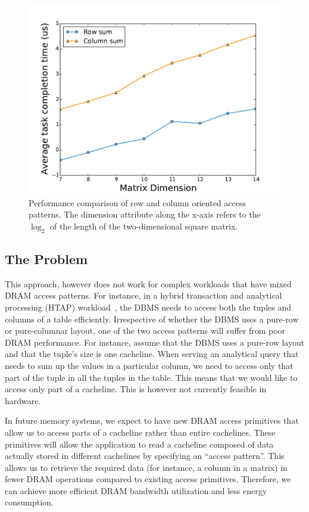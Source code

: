 \documentclass[letterpaper]{article}
\begin{document}
\begin{figure}[ht]
	\centering
	\includegraphics[scale=0.35]{images/rowmajor}
	\caption{Performance comparison of row and column oriented access patterns.
	The dimension attribute along the x-axis refers to the $\log_2$ of the length of the two-dimensional square matrix. }
	\label{fig:perf}
\end{figure}


\subsection{The Problem}

This approach, however does not work for complex workloads that have
mixed DRAM access patterns. For instance, in a hybrid transaction and
analytical processing (HTAP) workload~\cite{grund10}, the DBMS needs to 
access both the tuples and columns of a table efficiently. Irrespective of
whether the DBMS uses a pure-row or pure-columnar layout, one of the two
access patterns will suffer from poor DRAM performance. For instance, assume
that the DBMS uses a pure-row layout and that the tuple's size is one
cacheline. 
When serving an analytical query that needs to sum up the values in a
particular column, we need to access only that part of the tuple in all the tuples in
the table. This means that we would like to access only part of a cacheline.
This is however not currently feasible in hardware. 

In future memory systems, we expect to have new DRAM access primitives that
allow us to access parts of a cacheline rather than entire cachelines.
These primitives will allow the application to read a cacheline 
composed of data actually stored in different cachelines by specifying
an ``access pattern''.
This allows us to retrieve the required data (for instance, a column in a matrix) 
in fewer DRAM operations compared to existing access primitives. 
Therefore, we can achieve more efficient DRAM bandwidth utilization 
and less energy consumption.
\end{document}
